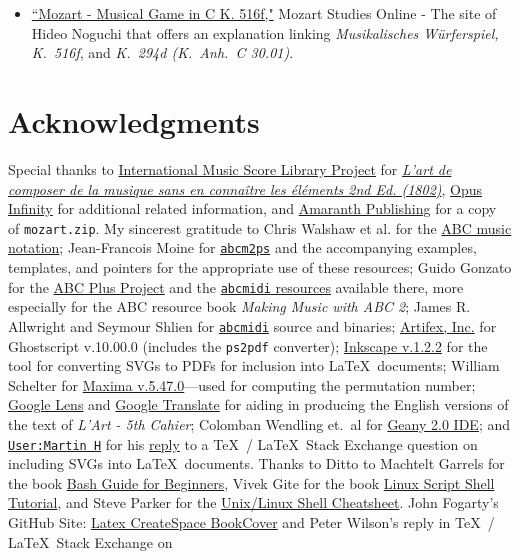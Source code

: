 \documentclass[a4paper,x11names,svgnames,10pt]{article}
\begin{document}
{\begin{itemize}
	\item \href{http://www.asahi-net.or.jp/\~rb5h-ngc/e/k516f.htm}{``Mozart - Musical Game in C K. 516f,"}	Mozart Studies Online - The site of Hideo Noguchi that offers an explanation linking {\em Musikalisches W\"{u}rferspiel, K.\ 516f}, and  {\em K.\ 294d (K.\ Anh.\ C 30.01)}. 
\end{itemize}

\newpage
\section{Acknowledgments}
Special thanks to \href{https://imslp.org}{International Music Score Library Project} for \href{https://imslp.org/wiki/L'art\_de_composer\_de\_la_musique\_sans\_en\_conna\%C3\%AEtre\_les\_\%C3\%A9l\%C3\%A9ments\_(Calegari\%2C\_Antonio)}{\it L'art de composer de la musique sans en connaître les éléments  2nd Ed. (1802)}, \href{https://opus-infinity.org}{Opus Infinity} for additional related information, and \href{http://www.amaranthpublishing.com/MozartDiceGame.htm}{Amaranth Publishing} for a copy of {\tt mozart.zip}. My sincerest gratitude to Chris Walshaw et al. for the \href{http://www.abcnotation.com/}{ABC music notation}; Jean-Francois Moine for \href{http://moinejf.free.fr/}{\tt abcm2ps} and the accompanying examples, templates, and pointers for the appropriate use of these resources; Guido Gonzato for the \href{http://abcplus.sourceforge.net/}{ABC Plus Project} and the \href{http://abcplus.sourceforge.net/#abcMIDI}{{\tt abcmidi} resources} available there, more especially for the ABC resource book {\em Making Music with ABC 2}; James R. Allwright and Seymour Shlien for \href{http://abc.sourceforge.net/abcMIDI}{\tt abcmidi} source and binaries; \href{https://artifex.com/}{Artifex, Inc.} for Ghostscript v.10.00.0 (includes the {\tt ps2pdf} converter); \href{https://www.inkscape.org/}{Inkscape v.1.2.2} for the tool for converting SVGs to PDFs for inclusion into \LaTeX\ documents; William Schelter for \href{https://maxima.sourceforge.io}{Maxima v.5.47.0}---used for computing the permutation number; \href{https://google.lens}{Google Lens} and \href{https://translate.google.com}{Google Translate} for aiding in producing the English versions of the text of {\it L'Art - 5th Cahier}; Colomban Wendling et.\ al for \href{https://www.geany.org}{Geany 2.0 IDE}; and \href{https://tex.stackexchange.com/users/632/martin-h}{\tt User:Martin H} for his \href{https://tex.stackexchange.com/questions/2099/how-to-include-svg-diagrams-in-latex}{reply} to a \TeX\ / \LaTeX\ Stack Exchange question on including SVGs into \LaTeX\ documents. Thanks to  Ditto to Machtelt Garrels for the book \href{http://tldp.org/LDP/Bash-Beginners-Guide/html/Bash-Beginners-Guide.html}{Bash Guide for Beginners}, Vivek Gite for the book \href{http://www.freeos.com/guides/lsst/}{Linux Script Shell Tutorial}, and Steve Parker for the \href{http://steve-parker.org/sh/cheatsheet.pdf}{Unix/Linux Shell Cheatsheet}. John Fogarty's GitHub Site: \href{https://github.com/jfogarty/latex-createspace-bookcover}{Latex CreateSpace BookCover} and Peter Wilson's reply in  \TeX\ / \LaTeX\ Stack Exchange on }
\end{document}
